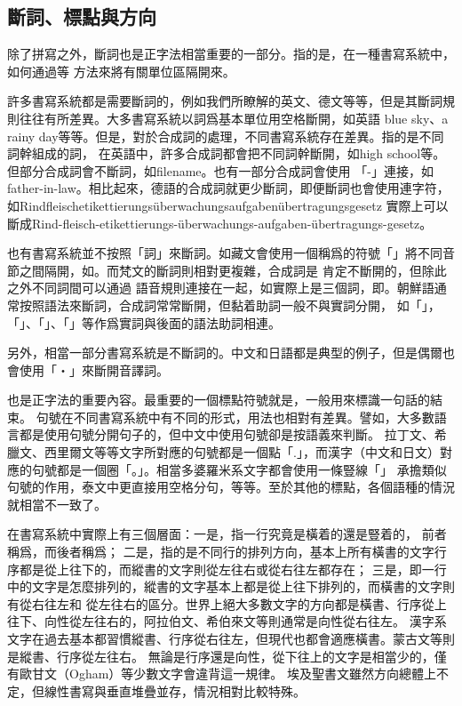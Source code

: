 \subsection{斷詞、標點與方向}
除了拼寫之外，斷詞也是正字法相當重要的一部分。指的是，在一種書寫系統中，如何通過等
方法來將有關單位區隔開來。

許多書寫系統都是需要斷詞的，例如我們所瞭解的英文、德文等等，但是其斷詞規則往往有所差異。大多書寫系統以詞爲基本單位用空格斷開，如英語
blue sky、a rainy day等等。但是，對於合成詞的處理，不同書寫系統存在差異。指的是不同詞幹組成的詞，
在英語中，許多合成詞都會把不同詞幹斷開，如high school等。但部分合成詞會不斷詞，如filename。也有一部分合成詞會使用
「-」連接，如father-in-law。相比起來，德語的合成詞就更少斷詞，即便斷詞也會使用連字符，如Rindfleischetikettierungsüberwachungsaufgabenübertragungsgesetz
實際上可以斷成Rind-fleisch-etikettierungs-überwachungs-aufgaben-übertragungs-gesetz。

也有書寫系統並不按照「詞」來斷詞。如藏文會使用一個稱爲的符號「」將不同音節之間隔開，如。而梵文的斷詞則相對更複雜，合成詞是
肯定不斷開的，但除此之外不同詞間可以通過
語音規則連接在一起，如實際上是三個詞，即。朝鮮語通常按照語法來斷詞，合成詞常常斷開，但黏着助詞一般不與實詞分開，
如「」，「」、「」、「」等作爲實詞與後面的語法助詞相連。

另外，相當一部分書寫系統是不斷詞的。中文和日語都是典型的例子，但是偶爾也會使用「・」來斷開音譯詞。

也是正字法的重要內容。最重要的一個標點符號就是，一般用來標識一句話的結束。
句號在不同書寫系統中有不同的形式，用法也相對有差異。譬如，大多數語言都是使用句號分開句子的，但中文中使用句號卻是按語義來判斷。
拉丁文、希臘文、西里爾文等等文字所對應的句號都是一個點「.」，而漢字（中文和日文）對應的句號都是一個圈「。」。相當多婆羅米系文字都會使用一條豎線「」
承擔類似句號的作用，泰文中更直接用空格分句，等等。至於其他的標點，各個語種的情況就相當不一致了。

在書寫系統中實際上有三個層面：一是，指一行究竟是橫着的還是豎着的，
前者稱爲，而後者稱爲；
二是，指的是不同行的排列方向，基本上所有橫書的文字行序都是從上往下的，而縱書的文字則從左往右或從右往左都存在；
三是，即一行中的文字是怎麼排列的，縱書的文字基本上都是從上往下排列的，而橫書的文字則有從右往左和
從左往右的區分。世界上絕大多數文字的方向都是橫書、行序從上往下、向性從左往右的，阿拉伯文、希伯來文等則通常是向性從右往左。
漢字系文字在過去基本都習慣縱書、行序從右往左，但現代也都會適應橫書。蒙古文等則是縱書、行序從左往右。
無論是行序還是向性，從下往上的文字是相當少的，僅有歐甘文（Ogham）等少數文字會違背這一規律。
埃及聖書文雖然方向總體上不定，但線性書寫與垂直堆疊並存，情況相對比較特殊。

